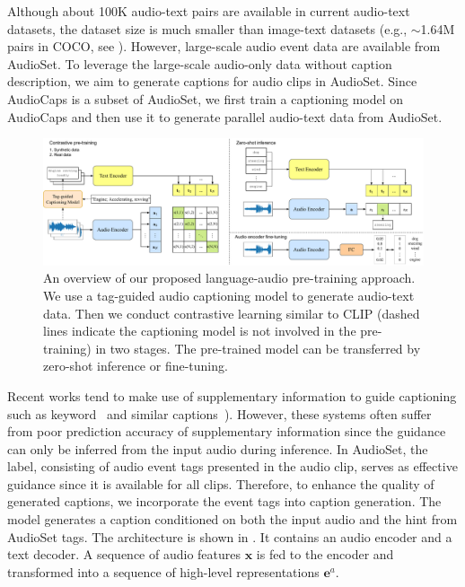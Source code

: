 \documentclass[sigconf]{acmart}
\begin{document}
Although about 100K audio-text pairs are available in current audio-text datasets, the dataset size is much smaller than image-text datasets (e.g., $\sim$1.64M pairs in COCO, see ). %
However, large-scale audio event data are available from AudioSet. 
To leverage the large-scale audio-only data without caption description, we aim to generate captions for audio clips in AudioSet.
Since AudioCaps is a subset of AudioSet, we first train a captioning model on AudioCaps and then use it to generate parallel audio-text data from AudioSet.
\begin{figure}[!htpb]
    \centering
    \includegraphics[width=\linewidth]{figs/BLAT.pdf}
    \caption{An overview of our proposed language-audio pre-training approach. We use a tag-guided audio captioning model to generate audio-text data. Then we conduct contrastive learning similar to CLIP (dashed lines indicate the captioning model is not involved in the pre-training) in two stages. The pre-trained model can be transferred by zero-shot inference or fine-tuning.}
    \label{fig:CLAP_framework}
\end{figure}
Recent works tend to make use of supplementary information to guide captioning such as keyword~\cite{eren2020semantic} and similar captions~\cite{koizumi2020audio}).
However, these systems often suffer from poor prediction accuracy of supplementary information since the guidance can only be inferred from the input audio during inference.
In AudioSet, the label, consisting of audio event tags presented in the audio clip, serves as effective guidance since it is available for all clips.
Therefore, to enhance the quality of generated captions, we incorporate the event tags into caption generation.
The model generates a caption conditioned on both the input audio and the hint from AudioSet tags.
The architecture is shown in .
It contains an audio encoder and a text decoder.
A sequence of audio features $\mathbf{x}$ is fed to the encoder and transformed into a sequence of high-level representations $\mathbf{e}^{a}$.
\end{document}
